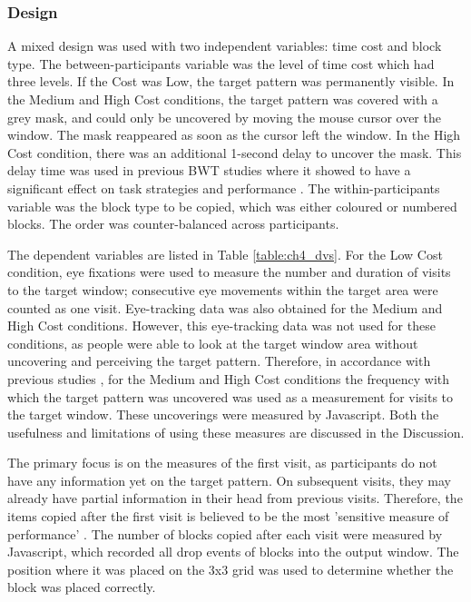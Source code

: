 \subsubsection{Design}
A mixed design was used with two independent variables: time cost and block type. The between-participants variable was the level of time cost which had three levels. If the Cost was Low, the target pattern was permanently visible. In the Medium and High Cost conditions, the target pattern was covered with a grey mask, and could only be uncovered by moving the mouse cursor over the window. The mask reappeared as soon as the cursor left the window. In the High Cost condition, there was an additional 1-second delay to uncover the mask. This delay time was used in previous BWT studies where it showed to have a significant effect on task strategies and performance \citep{Gray2006, Morgan2009, Waldron2007}. The within-participants variable was the block type to be copied, which was either coloured or numbered blocks. The order was counter-balanced across participants.

The dependent variables are listed in Table \ref{table:ch4_dvs}. For the Low Cost condition, eye fixations were used to measure the number and duration of visits to the target window; consecutive eye movements within the target area were counted as one visit. Eye-tracking data was also obtained for the Medium and High Cost conditions. However, this eye-tracking data was not used for these conditions, as people were able to look at the target window area without uncovering and perceiving the target pattern. Therefore, in accordance with previous studies \citep{Morgan2009, Patrick2014, Waldron2007, Waldron2011}, for the Medium and High Cost conditions the frequency with which the target pattern was uncovered was used as a measurement for visits to the target window. These uncoverings were measured by Javascript. Both the usefulness and limitations of using these measures are discussed in the Discussion.
 
The primary focus is on the measures of the first visit, as participants do not have any information yet on the target pattern. On subsequent visits, they may already have partial information in their head from previous visits. Therefore, the items copied after the first visit is believed to be the most 'sensitive measure of performance' \citep{Janssen2012}. 
The number of blocks copied after each visit were measured by Javascript, which recorded all drop events of blocks into the output window. The position where it was placed on the 3x3 grid was used to determine whether the block was placed correctly.

